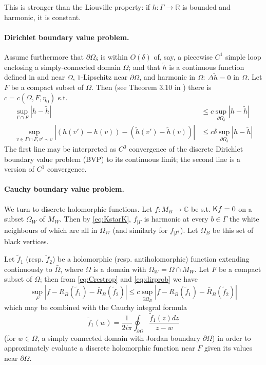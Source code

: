 \documentclass[10pt]{article}
\newcommand{\R}{\mathbb{R}}
\newcommand{\C}{\mathbb{C}}
\newcommand{\rK}{{\sf K}}
\newcommand{\dg}{\dagger}
\newcommand{\Lap}{\Delta\!}
\begin{document}
This is stronger than the Liouville property: if $h:\Gamma\rightarrow\R$ is bounded and harmonic, it is constant.

\paragraph{Dirichlet boundary value problem.\\}

Assume furthermore that $\partial\Omega_\delta$ is within $O(\delta)$ of, say, a piecewise $C^1$ simple loop enclosing a simply-connected domain $\Omega$; and that $\tilde h$ is a continuous function defined in and near $\Omega$, $1$-Lipschitz near $\partial\Omega$, and harmonic in $\Omega$: $\Lap\tilde h=0$ in $\Omega$. Let $F$ be a compact subset of $\Omega$. Then (see Theorem 3.10 in \cite{SmiChe_isoradial}) there is $c=c(\Omega,F,\eta_0)$ s.t.
\begin{equation}\label{eq:dirprob}
\begin{split}
\sup_{\Gamma\cap F}|h-\tilde h|&\leq c\sup_{\partial\Omega_\delta}|h-\tilde h|\\
\sup_{v\in\Gamma\cap F,v'\sim v}\left|(h(v')-h(v))-(\tilde h(v')-\tilde h(v))\right|&\leq c\delta\sup_{\partial\Omega_\delta}|h-\tilde h|
\end{split}
\end{equation}
The first line may be interpreted as $C^0$ convergence of the discrete Dirichlet boundary value problem (BVP) to its continuous limit; the second line is a version of $C^1$ convergence.

\paragraph{Cauchy boundary value problem.\\}

We turn to discrete holomorphic functions. Let $f:M_B\rightarrow\C$ be s.t. $\rK f=0$ on a subset $\Omega_W$ of $M_W$. Then by \eqref{eq:KstarK}, $f_{|\Gamma}$ is harmonic at every $b\in\Gamma$ the white neighbours of which are all in $\Omega_W$ (and similarly for $f_{|\Gamma^\dg}$). Let $\Omega_B$ be this set of black vertices.

Let $\tilde f_1$ (resp. $\tilde f_2$) be a holomorphic (resp. antiholomorphic) function extending continuously to $\bar\Omega$, where $\Omega$ is a domain with $\Omega_W=\Omega\cap M_W$. Let $F$ be a compact subset of $\Omega$; then from \eqref{eq:Crestrop} and \eqref{eq:dirprob} we have
\begin{equation}\label{eq:dirprobcauchy}
\sup_F\left|f-R_B(\tilde f_1)-\bar R_B(\tilde f_2)\right|\leq c\sup_{\partial\Omega_B}
\left|f-R_B(\tilde f_1)-\bar R_B(\tilde f_2)\right|  
\end{equation}
which may be combined with the Cauchy integral formula
$$\tilde f_1(w)=\frac{1}{2i\pi}\oint_{\partial\Omega}\frac{\tilde f_1(z)dz}{z-w}$$
(for $w\in\Omega$, a simply connected domain with Jordan boundary $\partial\Omega$) in order to approximately evaluate a discrete holomorphic function near $F$ given its values near $\partial\Omega$.
\end{document}
